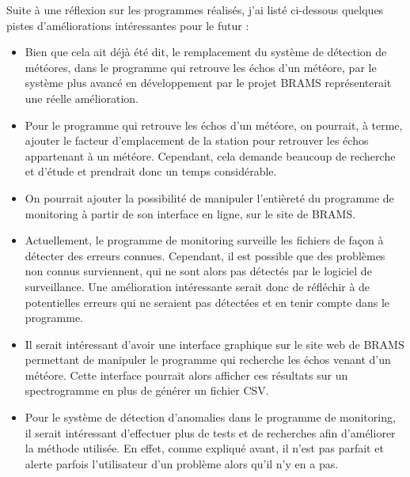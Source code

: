 \documentclass[11pt]{article}
\begin{document}
Suite à une réflexion sur les programmes réalisés, j'ai listé ci-dessous quelques pistes d'améliorations intéressantes pour le futur :
\begin{itemize}
    \item Bien que cela ait déjà été dit, le remplacement du système de détection de météores, dans le programme qui retrouve les échos d'un météore, par le système plus avancé en développement par le projet BRAMS représenterait une réelle amélioration.
    \item Pour le programme qui retrouve les échos d'un météore, on pourrait, à terme, ajouter le facteur d'emplacement de la station pour retrouver les échos appartenant à un météore.
          Cependant, cela demande beaucoup de recherche et d'étude et prendrait donc un temps considérable.
    \item On pourrait ajouter la possibilité de manipuler l'entièreté du programme de monitoring à partir de son interface en ligne, sur le site de BRAMS.
    \item Actuellement, le programme de monitoring surveille les fichiers de façon à détecter des erreurs connues.
          Cependant, il est possible que des problèmes non connus surviennent, qui ne sont alors pas détectés par le logiciel de surveillance.
          Une amélioration intéressante serait donc de réfléchir à de potentielles erreurs qui ne seraient pas détectées et en tenir compte dans le programme.
    \item Il serait intéressant d'avoir une interface graphique sur le site web de BRAMS permettant de manipuler le programme qui recherche les échos venant d'un météore.
          Cette interface pourrait alors afficher ces résultats sur un spectrogramme en plus de générer un fichier CSV.
    \item Pour le système de détection d'anomalies dans le programme de monitoring, il serait intéressant d'effectuer plus de tests et de recherches afin d'améliorer la méthode utilisée.
          En effet, comme expliqué avant, il n'est pas parfait et alerte parfois l'utilisateur d'un problème alors qu'il n'y en a pas.
\end{itemize}



\end{document}
